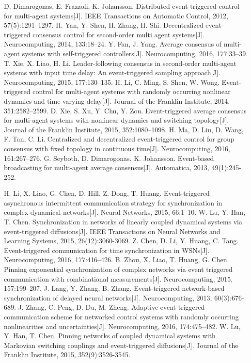 \begin{thebibliography}{99}
 D. Dimarogonas, E. Frazzoli, K. Johansson. Distributed-event-triggered control for multi-agent systems[J]. IEEE Transactions on Automatic Control, 2012, 57(5):1291–1297.
 H. Yan, Y. Shen, H. Zhang, H. Shi. Decentralized event-triggered consensus control for second-order multi agent systems[J]. Neurocomputing, 2014, 133:18–24.
 Y. Fan, J. Yang. Average consensus of multi-agent systems with self-triggered controllers[J]. Neurocomputing, 2016, 177:33–39.
 T. Xie, X. Liao, H. Li. Leader-following consensus in second-order multi-agent systems with input time delay: An event-triggered sampling approach[J]. Neurocomputing, 2015, 177:130–135.
 H. Li, C. Ming, S. Shen, W. Wong. Event-triggered control for multi-agent systems with randomly occurring nonlinear dynamics and time-varying delay[J]. Journal of the Franklin Institute, 2014, 351:2582–2599.
 D. Xie, S. Xu, Y. Chu, Y. Zou. Event-triggered average consensus for multi-agent systems with nonlinear dynamics and switching topology[J]. Journal of the Franklin Institute, 2015, 352:1080–1098.
 H. Ma, D. Liu, D. Wang, F. Tan, C. Li. Centralized and decentralized event-triggered control for group consensus with fixed topology in continuous time[J]. Neurocomputing, 2016, 161:267–276.
 G. Seyboth, D. Dimarogonas, K. Johansson. Event-based broadcasting for multi-agent average consensus[J]. Automatica, 2013, 49(1):245-252.

 H. Li, X. Liao, G. Chen, D. Hill, Z. Dong, T. Huang. Event-triggered asynchronous intermittent communication strategy for synchronization in complex dynamical networks[J]. Neural Networks, 2015, 66:1–10.
 W. Lu, Y. Han, T. Chen. Synchronization in networks of linearly coupled dynamical systems via event-triggered diffusions[J]. IEEE Transactions on Neural Networks and Learning Systems, 2015, 26(12):3060-3069.
 Z. Chen, D. Li, Y. Huang, C. Tang. Event-triggered communication for time synchronization in WSNs[J]. Neurocomputing, 2016, 177:416–426.
 B. Zhou, X. Liao, T. Huang, G. Chen. Pinning exponential synchronization of complex networks via event triggered communication with combinational measurements[J]. Neurocomputing, 2015, 157:199–207.
 J. Lang, Y. Zhang, B. Zhang. Event-triggered network-based synchronization of delayed neural networks[J]. Neurocomputing, 2013, 60(3):676-689.
 J. Zhang, C. Peng, D. Du, M. Zheng. Adaptive event-triggered communication scheme for networked control systems with randomly occurring nonlinearities and uncertainties[J]. Neurocomputing, 2016, 174:475–482.
 W. Lu, Y. Han, T. Chen. Pinning networks of coupled dynamical systems with Markovian switching couplings and event-triggered diffusions[J]. Journal of the Franklin Institute, 2015, 352(9):3526-3545.


\end{thebibliography}
